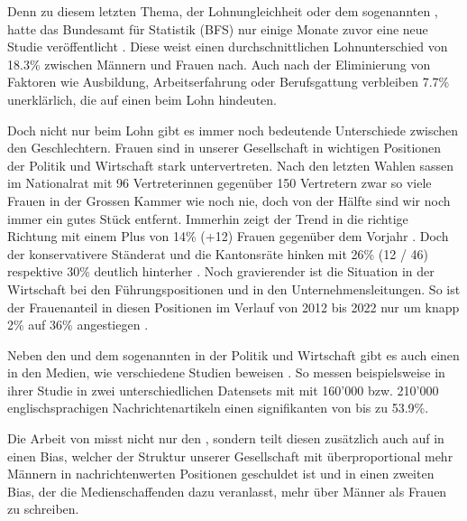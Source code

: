 

Denn zu diesem letzten Thema, der Lohnungleichheit oder dem sogenannten , hatte das Bundesamt für Statistik (BFS) %
nur einige Monate zuvor eine neue Studie veröffentlicht \cite{bfs-paygap}. Diese weist einen durchschnittlichen
Lohnunterschied von 18.3\% zwischen Männern und Frauen nach. Auch nach der Eliminierung von Faktoren wie
Ausbildung, Arbeitserfahrung oder Berufsgattung verbleiben 7.7\% unerklärlich, die auf einen
 beim Lohn hindeuten.

Doch nicht nur beim Lohn gibt es immer noch bedeutende Unterschiede zwischen den Geschlechtern.
Frauen sind in unserer Gesellschaft in wichtigen Positionen der Politik und Wirtschaft stark
untervertreten. Nach den letzten Wahlen sassen im Nationalrat mit 96 Vertreterinnen gegenüber 
150 Vertretern zwar so viele Frauen in der Grossen Kammer wie noch nie, doch von der Hälfte sind
wir noch immer ein gutes Stück entfernt. Immerhin zeigt der Trend in die richtige Richtung mit einem
Plus von 14\% (+12) Frauen gegenüber dem Vorjahr
\cite{frauen_politik}.
Doch der konservativere Ständerat und die Kantonsräte hinken mit 26\% (12 / 46) respektive 30\% deutlich hinterher
\cite{frauen_nationalrat}.
Noch gravierender ist die Situation in der Wirtschaft bei den Führungspositionen und in den Unternehmensleitungen. 
So ist der Frauenanteil in diesen Positionen im Verlauf von 2012 bis 2022 nur um knapp 2\%
auf 36\% angestiegen
\cite{frauen_statistiken_fpos}.


Neben den  und dem sogenannten  in der Politik und Wirtschaft
gibt es auch einen  in den Medien, wie verschiedene Studien beweisen
\cite{gender_gap_tracker,does-gender-matter-in-the-news,gender_bias_in_media}.
So messen beispielsweise \citeauthor{does-gender-matter-in-the-news} in ihrer Studie
 \cite{does-gender-matter-in-the-news} in
zwei unterschiedlichen Datensets mit mit 160'000 bzw. 210'000 englischsprachigen
Nachrichtenartikeln einen signifikanten  von bis zu 53.9\%.

Die Arbeit  von \citeauthor{gender_bias_in_media} \cite{gender_bias_in_media} misst nicht nur
den , sondern teilt diesen zusätzlich auch auf in einen Bias,
welcher der Struktur unserer Gesellschaft mit überproportional mehr Männern in nachrichtenwerten
Positionen geschuldet ist und in einen zweiten Bias, der die Medienschaffenden dazu veranlasst,
mehr über Männer als Frauen zu schreiben.

